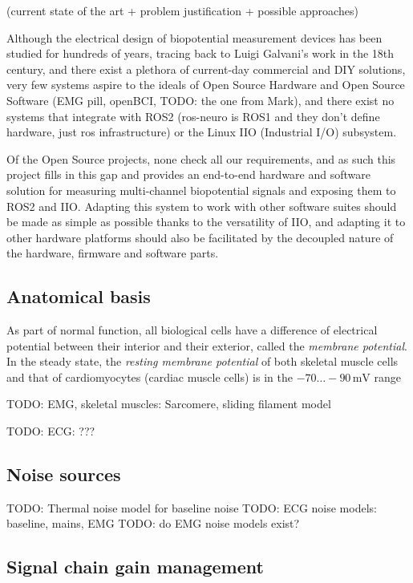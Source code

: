 \documentclass{thesis}
\newcommand{\todo}[1]{{\color{red}TODO: #1}}
\newcommand{\mV}{\,\text{mV}}
\begin{document}
(current state of the art + problem justification + possible approaches)


Although the electrical design of biopotential measurement devices has been studied for hundreds of years, tracing back to Luigi Galvani's work in the 18th century, and there exist a plethora of current-day commercial and DIY solutions, very few systems aspire to the ideals of Open Source Hardware and Open Source Software (EMG pill, openBCI, \todo{the one from Mark}), and there exist no systems that integrate with ROS2 (ros-neuro is ROS1 and they don't define hardware, just ros infrastructure) or the Linux IIO (Industrial I/O) subsystem.

Of the Open Source projects, none check all our requirements, and as such this project fills in this gap and provides an end-to-end hardware and software solution for measuring multi-channel biopotential signals and exposing them to ROS2 and IIO. Adapting this system to work with other software suites should be made as simple as possible thanks to the versatility of IIO, and adapting it to other hardware platforms should also be facilitated by the decoupled nature of the hardware, firmware and software parts.

\subsection{Anatomical basis}

As part of normal function, all biological cells have a difference of electrical potential between their interior and their exterior, called the \textit{membrane potential}. In the steady state, the \textit{resting membrane potential} of both skeletal muscle cells and that of cardiomyocytes (cardiac muscle cells) is in the $-70 \dots -90 \mV$ range \cite{Hopkins2006,Klabunde2011-jo}

\todo{EMG, skeletal muscles: Sarcomere, sliding filament model}

\todo{ECG: ???}

\subsection{Noise sources}

\todo{Thermal noise model for baseline noise}
\todo{ECG noise models: baseline, mains, EMG}
\todo{do EMG noise models exist?}

\subsection{Signal chain gain management}
\end{document}
